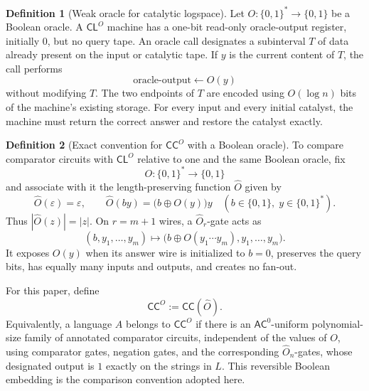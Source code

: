 \documentclass[10pt,a4paper]{article}
\theoremstyle{definition}
\newtheorem*{definition*}{Definition}
\begin{document}
\begin{definition*}[Weak oracle for catalytic logspace]
Let $O:\{0,1\}^*\to\{0,1\}$ be a Boolean oracle. A $\mathsf{CL}^O$ machine has
a one-bit read-only oracle-output register, initially $0$, but no query tape.
An oracle call designates a subinterval $T$ of data already present on the
input or catalytic tape. If $y$ is the current content of $T$, the call performs
\begin{equation}
  \text{oracle-output}\leftarrow O(y)
\end{equation}
without modifying $T$. The two endpoints of $T$ are encoded using $O(\log n)$
bits of the machine's existing storage. For every input and every initial
catalyst, the machine must return the correct answer and restore the catalyst
exactly.
\end{definition*}
\begin{definition*}[Exact convention for $\mathsf{CC}^{O}$ with a Boolean
oracle]

To compare comparator circuits with $\mathsf{CL}^{O}$ relative to one and the
same Boolean oracle, fix
\begin{equation}
                 O:\{0,1\}^{*}\longrightarrow\{0,1\}
\end{equation}
and associate with it the length-preserving function $\widehat O$ given by
\begin{equation}
  \widehat O(\varepsilon)=\varepsilon,
  \qquad
  \widehat O(by)=\bigl(b\oplus O(y)\bigr)y
  \quad
  (b\in\{0,1\},\;y\in\{0,1\}^{*}).
\end{equation}
Thus $|\widehat O(z)|=|z|$. On $r=m+1$ wires, a
$\widehat O_r$-gate acts as
\begin{equation}
  (b,y_1,\ldots,y_m)
  \longmapsto
  \bigl(b\oplus O(y_1\cdots y_m),y_1,\ldots,y_m\bigr).
\end{equation}
It exposes $O(y)$ when its answer wire is initialized to $b=0$, preserves the
query bits, has equally many inputs and outputs, and creates no fan-out.

For this paper, define
\begin{equation}
                         \boxed{\mathsf{CC}^{O}:=\mathsf{CC}(\widehat O)}.
\end{equation}
Equivalently, a language $A$ belongs to $\mathsf{CC}^{O}$ if there is an
$\mathsf{AC}^{0}$-uniform polynomial-size family of annotated comparator
circuits, independent of the values of $O$, using comparator gates, negation
gates, and the corresponding $\widehat O_n$-gates, whose designated output is
$1$ exactly on the strings in $L$. This reversible Boolean embedding is the
comparison convention adopted here.
\end{definition*}
\end{document}
